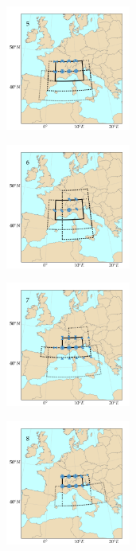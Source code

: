 \documentclass[twocol]{ametsoc}
\begin{document}
\begin{figure}[htb]
\begin{subfigure}{.5\columnwidth}
	\end{subfigure}
	\begin{subfigure}{.5\columnwidth}
		\centering
		\includegraphics[width=4.1cm]{figures/spatial_win_z4-hi4/Spatial_windows_5.png}
	\end{subfigure}%
	\begin{subfigure}{.5\columnwidth}
		\centering
		\includegraphics[width=4.1cm]{figures/spatial_win_z4-hi4/Spatial_windows_6.png}
	\end{subfigure}
	\begin{subfigure}{.5\columnwidth}
		\centering
		\includegraphics[width=4.1cm]{figures/spatial_win_z4-hi4/Spatial_windows_7.png}
	\end{subfigure}%
	\begin{subfigure}{.5\columnwidth}
		\centering
		\includegraphics[width=4.1cm]{figures/spatial_win_z4-hi4/Spatial_windows_8.png}

\end{subfigure}
\end{figure}
\end{document}
